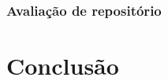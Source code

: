 \documentclass[12pt]{article}
\begin{document}
    \subsubsection{Avaliação de repositório}

\section{Conclusão}

\newpage


\end{document}
